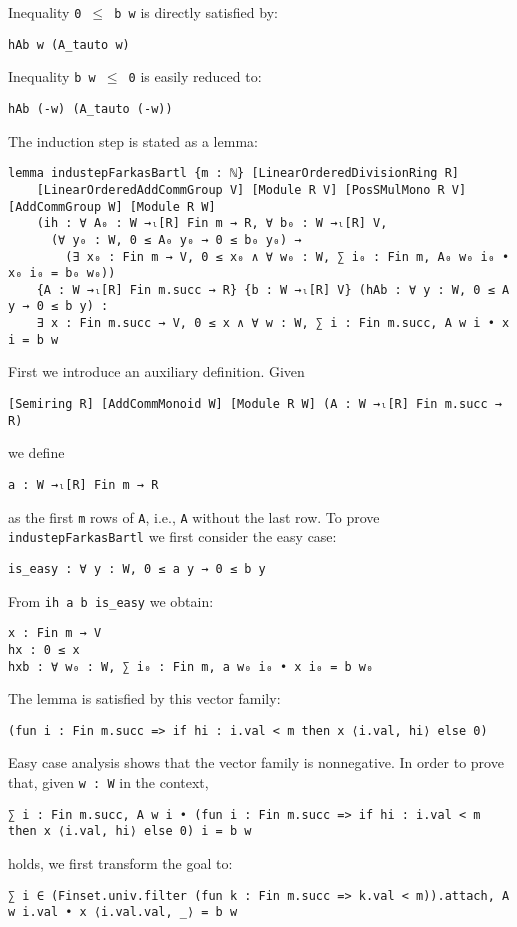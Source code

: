 \documentclass[]{article}
\renewcommand{\.}{\hskip .75pt}
\begin{document}
Inequality \texttt{0 $\le$ b w} is directly satisfied by:
\begin{lstlisting}
hAb w (A_tauto w)
\end{lstlisting}
Inequality \texttt{b w $\le$ 0} is easily reduced to:
\begin{lstlisting}
hAb (-w) (A_tauto (-w))
\end{lstlisting}
The induction step is stated as a lemma:
\begin{lstlisting}
lemma industepFarkasBartl {m : ℕ} [LinearOrderedDivisionRing R]
    [LinearOrderedAddCommGroup V] [Module R V] [PosSMulMono R V] [AddCommGroup W] [Module R W]
    (ih : ∀ A₀ : W →ₗ[R] Fin m → R, ∀ b₀ : W →ₗ[R] V,
      (∀ y₀ : W, 0 ≤ A₀ y₀ → 0 ≤ b₀ y₀) →
        (∃ x₀ : Fin m → V, 0 ≤ x₀ ∧ ∀ w₀ : W, ∑ i₀ : Fin m, A₀ w₀ i₀ • x₀ i₀ = b₀ w₀))
    {A : W →ₗ[R] Fin m.succ → R} {b : W →ₗ[R] V} (hAb : ∀ y : W, 0 ≤ A y → 0 ≤ b y) :
    ∃ x : Fin m.succ → V, 0 ≤ x ∧ ∀ w : W, ∑ i : Fin m.succ, A w i • x i = b w
\end{lstlisting}
First we introduce an auxiliary definition. Given
\begin{lstlisting}
[Semiring R] [AddCommMonoid W] [Module R W] (A : W →ₗ[R] Fin m.succ → R)
\end{lstlisting}
we define
\begin{lstlisting}
a : W →ₗ[R] Fin m → R
\end{lstlisting}
as the first \texttt{m} rows of \texttt{A}, i.e., \texttt{A} without the last row.
To prove \texttt{industepFarkasBartl} we first consider the easy case:
\begin{lstlisting}
is_easy : ∀ y : W, 0 ≤ a y → 0 ≤ b y
\end{lstlisting}
From \texttt{ih a b is\_easy} we obtain:
\begin{lstlisting}
x : Fin m → V
hx : 0 ≤ x
hxb : ∀ w₀ : W, ∑ i₀ : Fin m, a w₀ i₀ • x i₀ = b w₀
\end{lstlisting}
The lemma is satisfied by this vector family:
\begin{lstlisting}
(fun i : Fin m.succ => if hi : i.val < m then x ⟨i.val, hi⟩ else 0)
\end{lstlisting}
Easy case analysis shows that the vector family is nonnegative. In order to prove that, given \texttt{w :~W} in the context,
\begin{lstlisting}
∑ i : Fin m.succ, A w i • (fun i : Fin m.succ => if hi : i.val < m then x ⟨i.val, hi⟩ else 0) i = b w
\end{lstlisting}
holds, we first transform the goal to:
\begin{lstlisting}
∑ i ∈ (Finset.univ.filter (fun k : Fin m.succ => k.val < m)).attach, A w i.val • x ⟨i.val.val, _⟩ = b w
\end{lstlisting}
\end{document}
